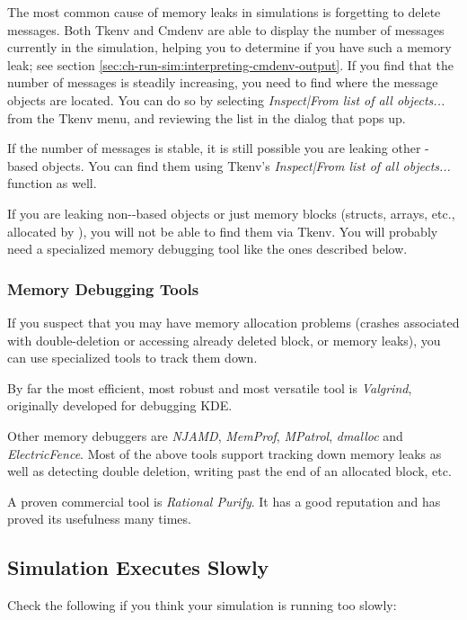 The most common cause of memory leaks in {\opp} simulations is
forgetting to delete messages. Both Tkenv and Cmdenv are able
to display the number of messages currently in the simulation,
helping you to determine if you have such a memory leak;
see section \ref{sec:ch-run-sim:interpreting-cmdenv-output}.
If you find that the number of messages is steadily increasing,
you need to find where the message objects are located. You can do so
by selecting \textit{Inspect|From list of all objects...} from
the Tkenv menu, and reviewing the list in the dialog that pops up.

If the number of messages is stable, it is still possible
you are leaking other -based objects. You can
find them using Tkenv's \textit{Inspect|From list of all objects...}
function as well.

If you are leaking non--based objects or just
memory blocks (structs, arrays, etc., allocated by ),
you will not be able to find them via Tkenv. You will probably need
a specialized memory debugging tool like the ones described below.

\subsubsection{Memory Debugging Tools}

If you suspect that you may have memory allocation problems
(crashes associated with double-deletion or accessing already
deleted block, or memory leaks), you can use specialized tools
to track them down.

By far the most efficient, most robust and most versatile tool
is \textit{Valgrind}, originally developed for debugging KDE.

Other memory debuggers are \textit{NJAMD}, \textit{MemProf},
\textit{MPatrol}, \textit{dmalloc} and \textit{ElectricFence}.
Most of the above tools support tracking down memory leaks as well as
detecting double deletion, writing past the end of an allocated block, etc.

A proven commercial tool is \textit{Rational Purify}. It has
a good reputation and has proved its usefulness many times.

\subsection{Simulation Executes Slowly}

Check the following if you think your simulation is running too slowly:

